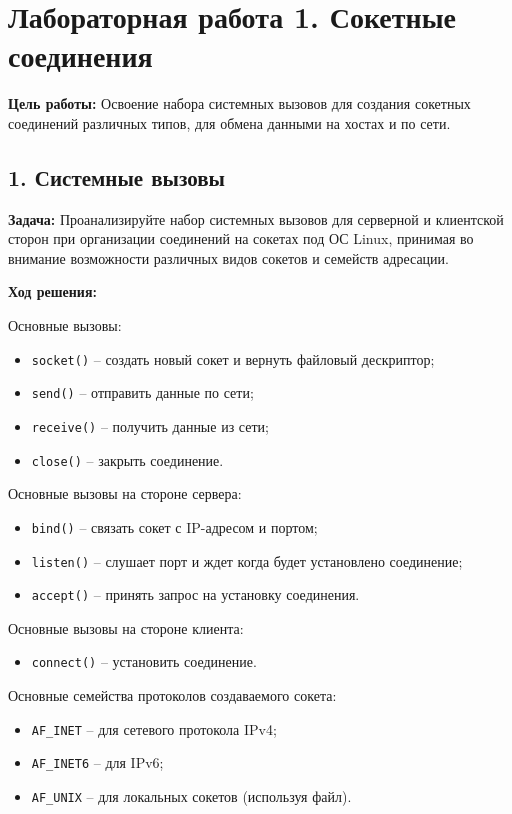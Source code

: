 \chapter*{Лабораторная работа 1. Сокетные соединения}

\textbf{Цель работы:} Освоение набора системных вызовов для создания сокетных соединений различных типов, для обмена данными на хостах и по сети.

\section*{1. Системные вызовы}
\textbf{Задача:} Проанализируйте набор системных вызовов для серверной и клиентской сторон при организации соединений на сокетах под ОС Linux, принимая во внимание возможности различных видов сокетов и семейств адресации.

\textbf{Ход решения:}

Основные вызовы:
\begin{itemize}
    \item \texttt{socket()} -- создать новый сокет и вернуть файловый дескриптор;
    \item \texttt{send()} -- отправить данные по сети;
    \item \texttt{receive()} -- получить данные из сети;
    \item \texttt{close()} -- закрыть соединение.
\end{itemize}

Основные вызовы на стороне сервера:
\begin{itemize}
    \item \texttt{bind()} -- связать сокет с IP-адресом и портом;
    \item \texttt{listen()} -- слушает порт и ждет когда будет установлено соединение;
    \item \texttt{accept()} -- принять запрос на установку соединения.
\end{itemize}

Основные вызовы на стороне клиента:
\begin{itemize}
    \item \texttt{connect()} -- установить соединение.
\end{itemize}

Основные семейства протоколов создаваемого сокета:
\begin{itemize}
    \item \texttt{AF\_INET} -- для сетевого протокола IPv4;
    \item \texttt{AF\_INET6} -- для IPv6;
    \item \texttt{AF\_UNIX} -- для локальных сокетов (используя файл).
\end{itemize}

